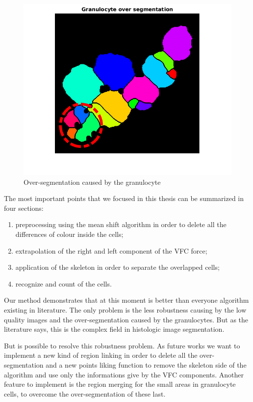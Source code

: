 \begin{figure}
\begin{center}
		\includegraphics[scale=0.5]{img/final/fingran.png}
		\caption{Over-segmentation caused by the granulocyte}
		\label{fig:gran}
\end{center}
\end{figure}

The most important points that we focused in this thesis can be summarized in four sections:
\begin{enumerate}
\item preprocessing using the mean shift algorithm in order to delete all the differences of colour inside the cells;
\item extrapolation of the right and left component of the VFC force;
\item application of the skeleton in order to separate the overlapped cells;
\item recognize and count of the cells.
\end{enumerate}

\bigskip

Our method demonstrates that at this moment is better than everyone algorithm existing in literature. The only problem is the less robustness causing by the low quality images and the over-segmentation caused by the granulocytes. But as the literature says, this is the complex field in histologic image segmentation.

\bigskip

But is possible to resolve this robustness problem. As future works we want to implement a new kind of region linking in order to delete all the over-segmentation and a new points liking function to remove the skeleton side of the algorithm and use only the informations give by the VFC components. Another feature to implement is the region merging for the small areas in granulocyte cells, to overcome the over-segmentation of these last. 